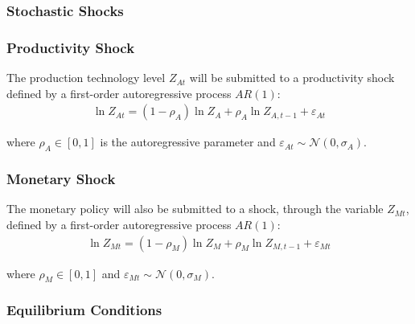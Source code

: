 \documentclass[
thesis.tex
]{subfiles}
\begin{document}
	
	\subsubsection{Stochastic Shocks}\label{sec:stochastic-shocks}
	
	\subsubsection*{Productivity Shock} \label{sec:productivity shock}
	
	The production technology level $Z_{At}$ will be submitted to a productivity shock defined by a first-order autoregressive process $AR(1)$:
	\begin{align}
		\ln{Z_{At}} = (1-\rho_A)\ln{Z_A} + \rho_A\ln{Z_{A,t-1}} + \varepsilon_{At} \label{eq:productivity-shock}
	\end{align}
	
	where $\rho_A \in [0,1]$ is the autoregressive parameter and $\varepsilon_{At} \sim \mathscr{N}(0,\sigma_A)$.
	
	\subsubsection*{Monetary Shock} \label{sec:monetary shock}
	
	The monetary policy will also be submitted to a shock, through the variable $Z_{Mt}$, defined by a first-order autoregressive process $AR(1)$:
	\begin{align}
		\ln{Z_{Mt}} = (1-\rho_M)\ln{Z_{M}} + \rho_M\ln{Z_{M,t-1}} + \varepsilon_{Mt} \label{eq:monetary-shock}
	\end{align}
	
	where $\rho_M \in [0,1]$ and $\varepsilon_{Mt} \sim \mathscr{N}(0,\sigma_M)$.
	
	
	\subsubsection{Equilibrium Conditions}
	
	
\end{document}
